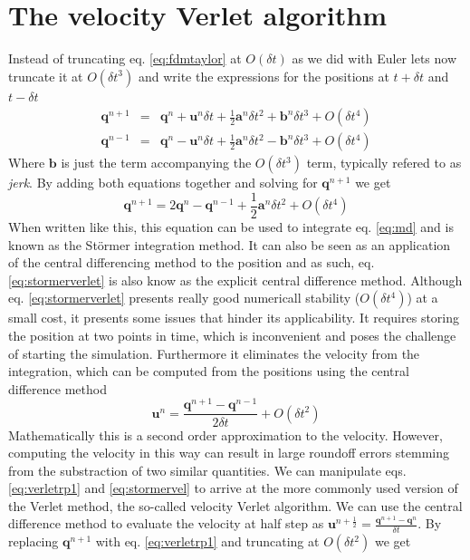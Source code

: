 \documentclass[ twoside,openright,titlepage,numbers=noenddot,%
headinclude,footinclude,cleardoublepage=empty,abstract=on,
BCOR=5mm,paper=a4,fontsize=11pt, dvipsnames
]{scrreprt}
\renewcommand{\vec}[1]{\bm{#1}}
\newcommand{\dt}{\delta t}
\newcommand{\half}{\frac{1}{2}}
\newcommand{\ppos}{q}
\newcommand{\pvel}{u}
\begin{document}
\section{The velocity Verlet algorithm}\label{sec:velocityverlet}
Instead of truncating eq. \eqref{eq:fdmtaylor} at $O(\dt)$ as we did with Euler lets now truncate it at $O(\dt^3)$ and write the expressions for the positions at $t+\dt$ and $t-\dt$
\begin{eqnarray}
  \label{eq:verletrp1}
  \vec{\ppos}^{n+1} &=& \vec{\ppos}^n + \vec{\pvel}^n\dt + \half\vec{a}^n\dt^2 + \vec{b}^n\dt^3 + O(\dt^4)\\
  \vec{\ppos}^{n-1} &=& \vec{\ppos}^n - \vec{\pvel}^n\dt + \half\vec{a}^n\dt^2 - \vec{b}^n\dt^3 + O(\dt^4)
\end{eqnarray}
Where $\vec{b}$ is just the term accompanying the $O(\dt^3)$ term, typically refered to as \emph{jerk}.
By adding both equations together and solving for $\vec{\ppos}^{n+1}$ we get
\begin{equation}
  \label{eq:stormerverlet}
  \vec{\ppos}^{n+1} = 2\vec{\ppos}^n - \vec{\ppos}^{n-1} + \half\vec{a}^n\dt^2 + O(\dt^4)
\end{equation}
When written like this, this equation can be used to integrate eq. \eqref{eq:md} and is known as the Störmer integration method. It can also be seen as an application of the central differencing method to the position and as such, eq. \eqref{eq:stormerverlet} is also know as the explicit central difference method.
Although eq. \eqref{eq:stormerverlet} presents really good numericall stability ($O(\dt^4)$) at a small cost, it presents some issues that hinder its applicability.
It requires storing the position at two points in time, which is inconvenient and poses the challenge of starting the simulation.
Furthermore it eliminates the velocity from the integration, which can be computed from the positions using the central difference method
\begin{equation}
  \label{eq:stormervel}
  \vec{\pvel}^n = \frac{\vec{\ppos} ^{n+1} - \vec{\ppos}^{n-1}}{2\dt} + O(\dt^2)
\end{equation}
Mathematically this is a second order approximation to the velocity. However, computing the velocity in this way can result in large roundoff errors stemming from the substraction of two similar quantities.
We can manipulate eqs. \eqref{eq:verletrp1} and \eqref{eq:stormervel} to arrive at the more commonly used version of the Verlet method, the so-called velocity Verlet algorithm.
We can use the central difference method to evaluate the velocity at half step as $\vec{\pvel}^{n+\half} = \frac{\vec{\ppos}^{n+1} - \vec{\ppos}^n}{\dt}$. By replacing $\vec{\ppos}^{n+1}$ with eq. \eqref{eq:verletrp1} and truncating at $O(\dt^2)$ we get
\end{document}
